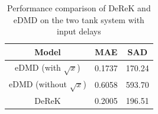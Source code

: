 \documentclass[conference]{IEEEtran}
\begin{document}
\begin{table}[htbp]\label{tab:two_tanks_results}
    \caption{Performance comparison of DeReK and eDMD on the two tank system with input delays}
    \begin{center}
        \begin{tabular}{c| S[table-format=1.4] S[table-format=3.2]}
            \toprule
            \textbf{Model}              & \textbf{MAE} & \textbf{SAD} \\
            \midrule
            eDMD (with \(\sqrt{x}\))    & 0.1737       & 170.24       \\
            eDMD (without \(\sqrt{x}\)) & 0.6058       & 593.70       \\
            DeReK                       & 0.2005       & 196.51       \\
            \bottomrule
        \end{tabular}
    \end{center}
\end{table}





\end{document}
